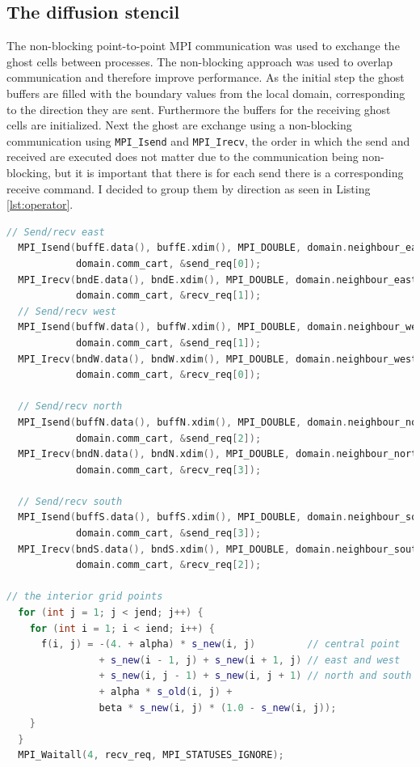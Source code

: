 \subsection{The diffusion stencil}
The non-blocking point-to-point MPI communication was used to exchange the ghost cells between processes. The non-blocking approach was used to overlap communication and therefore improve performance.
As the initial step the ghost buffers are filled with the boundary values from the local domain, corresponding to the direction they are sent. Furthermore the buffers for the receiving ghost cells are initialized.
Next the ghost are exchange using a non-blocking communication using \texttt{MPI\_Isend} and \texttt{MPI\_Irecv}, the order in which the send and received are executed does not matter due to the communication being non-blocking, but it is important that there is for each send there is a corresponding receive command. I decided to group them by direction as seen in Listing \ref{lst:operator}.
\begin{lstlisting}[language=C++, label=lst:operator, caption=Non-blocking send and receive pattern]
  // Send/recv east
  MPI_Isend(buffE.data(), buffE.xdim(), MPI_DOUBLE, domain.neighbour_east, 0,
            domain.comm_cart, &send_req[0]);
  MPI_Irecv(bndE.data(), bndE.xdim(), MPI_DOUBLE, domain.neighbour_east, 1,
            domain.comm_cart, &recv_req[1]);
  // Send/recv west
  MPI_Isend(buffW.data(), buffW.xdim(), MPI_DOUBLE, domain.neighbour_west, 1,
            domain.comm_cart, &send_req[1]);
  MPI_Irecv(bndW.data(), bndW.xdim(), MPI_DOUBLE, domain.neighbour_west, 0,
            domain.comm_cart, &recv_req[0]);

  // Send/recv north
  MPI_Isend(buffN.data(), buffN.xdim(), MPI_DOUBLE, domain.neighbour_north, 2,
            domain.comm_cart, &send_req[2]);
  MPI_Irecv(bndN.data(), bndN.xdim(), MPI_DOUBLE, domain.neighbour_north, 3,
            domain.comm_cart, &recv_req[3]);

  // Send/recv south
  MPI_Isend(buffS.data(), buffS.xdim(), MPI_DOUBLE, domain.neighbour_south, 3,
            domain.comm_cart, &send_req[3]);
  MPI_Irecv(bndS.data(), bndS.xdim(), MPI_DOUBLE, domain.neighbour_south, 2,
            domain.comm_cart, &recv_req[2]);
 
// the interior grid points
  for (int j = 1; j < jend; j++) {
    for (int i = 1; i < iend; i++) {
      f(i, j) = -(4. + alpha) * s_new(i, j)         // central point
                + s_new(i - 1, j) + s_new(i + 1, j) // east and west
                + s_new(i, j - 1) + s_new(i, j + 1) // north and south
                + alpha * s_old(i, j) +
                beta * s_new(i, j) * (1.0 - s_new(i, j));
    }
  }
  MPI_Waitall(4, recv_req, MPI_STATUSES_IGNORE);
\end{lstlisting}
